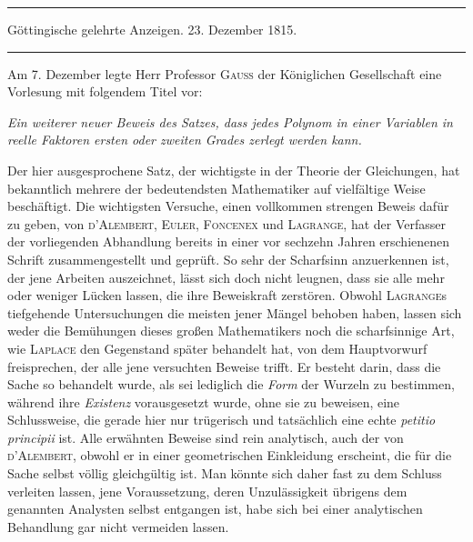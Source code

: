 \begin{center}
\rule{0.65\linewidth}{0.4pt}\par
Göttingische gelehrte Anzeigen. 23. Dezember 1815.\par
\rule{0.65\linewidth}{0.4pt}
\end{center}

Am 7. Dezember legte Herr Professor \textsc{Gauss} der Königlichen Gesellschaft eine Vorlesung mit folgendem Titel vor:

\begin{center}
\emph{Ein weiterer neuer Beweis des Satzes, dass jedes Polynom in einer Variablen in reelle Faktoren ersten oder zweiten Grades zerlegt werden kann.}
\end{center}

Der hier ausgesprochene Satz, der wichtigste in der Theorie der Gleichungen, hat bekanntlich mehrere der bedeutendsten Mathematiker auf vielfältige Weise beschäftigt. Die wichtigsten Versuche, einen vollkommen strengen Beweis dafür zu geben, von \textsc{d'Alembert}, \textsc{Euler}, \textsc{Foncenex} und \textsc{Lagrange}, hat der Verfasser der vorliegenden Abhandlung bereits in einer vor sechzehn Jahren erschienenen Schrift zusammengestellt und geprüft. So sehr der Scharfsinn anzuerkennen ist, der jene Arbeiten auszeichnet, lässt sich doch nicht leugnen, dass sie alle mehr oder weniger Lücken lassen, die ihre Beweiskraft zerstören. Obwohl \textsc{Lagrange}s tiefgehende Untersuchungen die meisten jener Mängel behoben haben, lassen sich weder die Bemühungen dieses großen Mathematikers noch die scharfsinnige Art, wie \textsc{Laplace} den Gegenstand später behandelt hat, von dem Hauptvorwurf freisprechen, der alle jene versuchten Beweise trifft. Er besteht darin, dass die Sache so behandelt wurde, als sei lediglich die \emph{Form} der Wurzeln zu bestimmen, während ihre \emph{Existenz} vorausgesetzt wurde, ohne sie zu beweisen,
eine Schlussweise, die gerade hier nur trügerisch und tatsächlich eine echte \emph{petitio principii} ist. Alle erwähnten Beweise sind rein analytisch, auch der von \textsc{d'Alembert}, obwohl er in einer geometrischen Einkleidung erscheint, die für die Sache selbst völlig gleichgültig ist. Man könnte sich daher fast zu dem Schluss verleiten lassen, jene Voraussetzung, deren Unzulässigkeit übrigens dem genannten Analysten selbst entgangen ist, habe sich bei einer analytischen Behandlung gar nicht vermeiden lassen.

